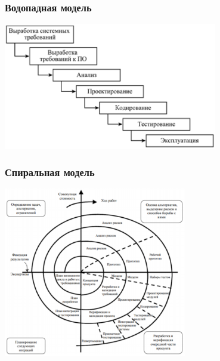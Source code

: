 \documentclass[xetex,mathserif,serif]{beamer}
\begin{document}
    \begin{frame}
        \frametitle{Водопадная модель}
        \begin{center}
            \includegraphics[width=0.7\textwidth]{waterfall-model.png}
        \end{center}
    \end{frame}

    \begin{frame}
        \frametitle{Спиральная модель}
        \begin{center}
            \includegraphics[width=0.6\textwidth]{spiral-model.png}
        \end{center}
    \end{frame}
\end{document}
